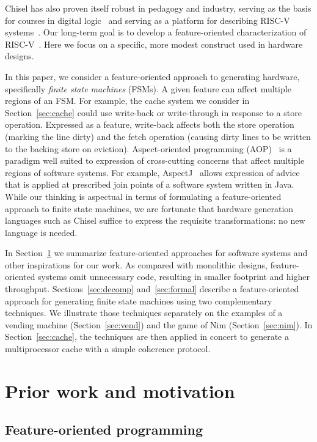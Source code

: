 \documentclass[sigplan,anonymous,review]{acmart}
\begin{document}
Chisel has also proven itself robust in pedagogy and industry, serving as the basis for courses in digital logic~\cite{vlsicourse} and serving as a platform for describing RISC-V systems~\cite{chisel:riscv}.  Our long-term goal is to develop a feature-oriented characterization of RISC-V~\cite{riscv}.  Here we focus on a specific, more modest construct used in hardware designs.

In this paper, we consider a feature-oriented approach to generating hardware, specifically \emph{finite state machines} (FSMs). A given feature can affect multiple regions of an FSM. For example, the cache system  we consider in Section~\ref{sec:cache} could use write-back or write-through in response to a store operation. Expressed as a feature, write-back affects both the store operation (marking the line dirty) and the fetch operation (causing dirty lines to be written to the backing store on eviction). Aspect-oriented programming (AOP)~\cite{gregor:97} is a paradigm well suited to expression of cross-cutting concerns that affect multiple regions of software systems. For example, AspectJ~\cite{aspectj} allows expression of advice that is applied at prescribed join points of a software system written in Java. While our thinking is aspectual in terms of formulating a feature-oriented approach to finite state machines, we are fortunate that hardware generation languages such as Chisel suffice to express the requisite transformations:  no new language is needed.

In Section~\ref{sec:prior} we summarize feature-oriented approaches for software systems and other inspirations for our work. As compared with monolithic designs, feature-oriented systems omit unnecessary code, resulting in smaller footprint and higher throughput.
Sections~\ref{sec:decomp} and~\ref{sec:formal} describe a feature-oriented approach for generating finite state machines using two complementary techniques. We illustrate those techniques separately on the examples of a vending machine (Section~\ref{sec:vend}) and the game of Nim (Section~\ref{sec:nim}). In Section~\ref{sec:cache}, the techniques are then applied in concert to generate a multiprocessor cache with a simple coherence protocol.

\section{Prior work and motivation}\label{sec:prior}

\subsection{Feature-oriented programming}\label{sec:priorfop}
\end{document}
